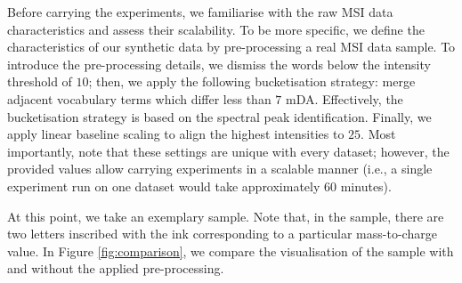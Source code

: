 \documentclass{mpaper}
\begin{document}

\par Before carrying the experiments, we familiarise with the raw MSI data characteristics and assess their scalability. To be more specific, we define the characteristics of our synthetic data by pre-processing a real MSI data sample. To introduce the pre-processing details, we dismiss the words below the intensity threshold of $10$; then, we apply the following bucketisation strategy: merge adjacent vocabulary terms which differ less than $7$ mDA. Effectively, the bucketisation strategy is based on the spectral peak identification. Finally, we apply linear baseline scaling to align the highest intensities to $25$. Most importantly, note that these settings are unique with every dataset; however, the provided values allow carrying experiments in a scalable manner (i.e., a single experiment run on one dataset would take approximately $60$ minutes).

\par At this point, we take an exemplary sample. Note that, in the sample, there are two letters inscribed with the ink corresponding to a particular mass-to-charge value. In Figure \ref{fig:comparison}, we compare the visualisation of the sample with and without the applied pre-processing.
\end{document}
